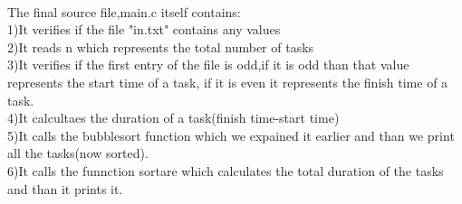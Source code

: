 \documentclass[14pt]{article}
\begin{document}
\\The final source file,main.c itself contains:
\\1)It verifies if the file "in.txt" contains any values
\\2)It reads n which represents the total number of tasks
\\3)It verifies if the first entry of the file is odd,if it is odd than that value represents the start time of a task, if it is even it represents the finish time of a task.
\\4)It calcultaes the duration of a task(finish time-start time) 
\\5)It calls the bubblesort function which we expained it earlier and than we print all the tasks(now sorted).
\\6)It calls the funnction sortare which calculates the total duration of the tasks and than it prints it.

\newpage
\end{document}
